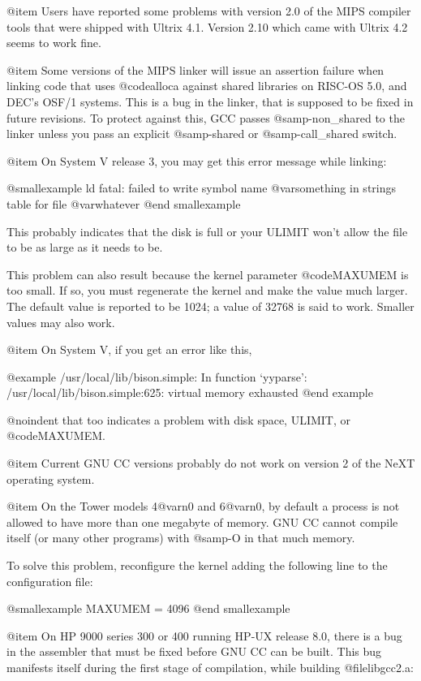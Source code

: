 @item
Users have reported some problems with version 2.0 of the MIPS
compiler tools that were shipped with Ultrix 4.1.  Version 2.10
which came with Ultrix 4.2 seems to work fine.

@item
Some versions of the MIPS linker will issue an assertion failure
when linking code that uses @code{alloca} against shared
libraries on RISC-OS 5.0, and DEC's OSF/1 systems.  This is a bug
in the linker, that is supposed to be fixed in future revisions.
To protect against this, GCC passes @samp{-non_shared} to the
linker unless you pass an explicit @samp{-shared} or
@samp{-call_shared} switch.

@item
On System V release 3, you may get this error message
while linking:

@smallexample
ld fatal: failed to write symbol name @var{something} 
 in strings table for file @var{whatever}
@end smallexample

This probably indicates that the disk is full or your ULIMIT won't allow
the file to be as large as it needs to be.

This problem can also result because the kernel parameter @code{MAXUMEM}
is too small.  If so, you must regenerate the kernel and make the value
much larger.  The default value is reported to be 1024; a value of 32768
is said to work.  Smaller values may also work.

@item
On System V, if you get an error like this,

@example
/usr/local/lib/bison.simple: In function `yyparse':
/usr/local/lib/bison.simple:625: virtual memory exhausted
@end example

@noindent
that too indicates a problem with disk space, ULIMIT, or @code{MAXUMEM}.

@item
Current GNU CC versions probably do not work on version 2 of the NeXT
operating system.

@item
On the Tower models 4@var{n}0 and 6@var{n}0, by default a process is not
allowed to have more than one megabyte of memory.  GNU CC cannot compile
itself (or many other programs) with @samp{-O} in that much memory.

To solve this problem, reconfigure the kernel adding the following line
to the configuration file:

@smallexample
MAXUMEM = 4096
@end smallexample

@item
On HP 9000 series 300 or 400 running HP-UX release 8.0, there is a bug
in the assembler that must be fixed before GNU CC can be built.  This
bug manifests itself during the first stage of compilation, while
building @file{libgcc2.a}:

